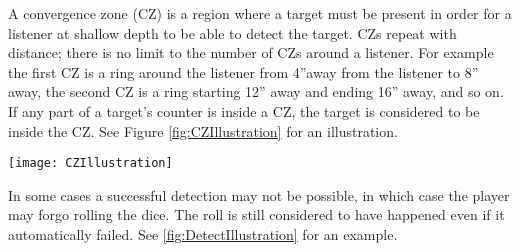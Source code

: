 \documentclass[../TacSubMicroRules.tex]{subfiles}
\begin{document}
 A convergence zone (CZ) is a region where a target must be present in order for a listener at shallow depth to be able to detect the target.
CZs repeat with distance; there is no limit to the number of CZs around a listener.
For example the first CZ is a ring around the listener from 4''away from the listener to 8'' away, the second CZ is a ring starting 12'' away and ending 16'' away, and so on.
If any part of a target's counter is inside a CZ, the target is considered to be inside the CZ.
See Figure \ref{fig:CZIllustration} for an illustration.

\begin{Figure}
    \centering
    \texttt{[image: CZIllustration]}
    \label{fig:CZIllustration}
\end{Figure}

 
In some cases a successful detection may not be possible, in which case the player may forgo rolling the dice.
The roll is still considered to have happened even if it automatically failed.
See \ref{fig:DetectIllustration} for an example.
\end{document}
